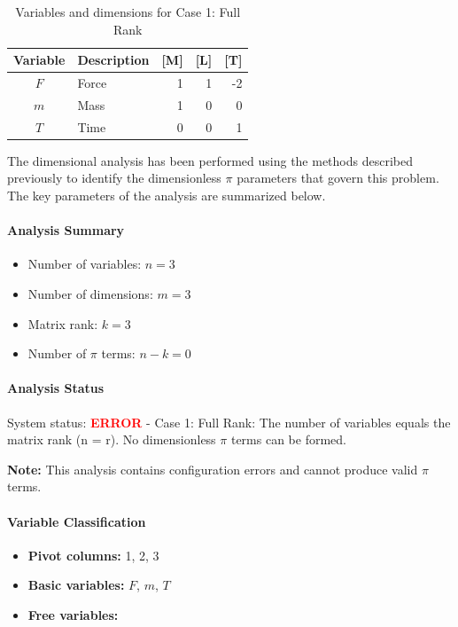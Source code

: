 \begin{table}[H]
\centering
\begin{tabular}{|c|l|r|r|r|}
\hline
\textbf{Variable} & \textbf{Description} & \textbf{[M]} & \textbf{[L]} & \textbf{[T]} \\
\hline
$F$ & Force & 1 & 1 & -2 \\
$m$ & Mass & 1 & 0 & 0 \\
$T$ & Time & 0 & 0 & 1 \\

\hline
\end{tabular}
\caption{Variables and dimensions for Case 1: Full Rank}
\end{table}

The dimensional analysis has been performed using the methods described previously to identify the dimensionless $\pi$ parameters that govern this problem. The key parameters of the analysis are summarized below.

\paragraph{Analysis Summary}
\begin{itemize}
\item Number of variables: $n = 3$
\item Number of dimensions: $m = 3$
\item Matrix rank: $k = 3$
\item Number of $\pi$ terms: $n - k = 0$
\end{itemize}

\paragraph{Analysis Status}
System status: \textcolor{red}{\textbf{ERROR}} - Case 1: Full Rank: The number of variables equals the matrix rank (n = r). No dimensionless $\pi$ terms can be formed.

\textbf{Note:} This analysis contains configuration errors and cannot produce valid $\pi$ terms.


\paragraph{Variable Classification}
\begin{itemize}
\item \textbf{Pivot columns:} 1, 2, 3
\item \textbf{Basic variables:} $F$, $m$, $T$
\item \textbf{Free variables:}
\end{itemize}

